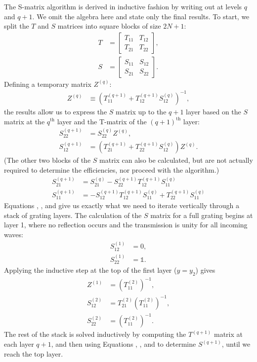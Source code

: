 The S-matrix algorithm is derived in inductive fashion by writing out  at levels $q$ and $q+1$.  We omit the algebra here and state only the final results.  To start, we split the $T$ and $S$ matrices into square blocks of size $2N+1$:
\begin{align}
T &= \left[\begin{array}{c|c}T_{11} & T_{12} \\\hline T_{21} & T_{22}\end{array}\right], \\
S &= \left[\begin{array}{c|c}S_{11} & S_{12} \\\hline S_{21} & S_{22}\end{array}\right].
\end{align}
Defining a temporary matrix $Z^{(q)}$:
\begin{align}
\label{SmatZ}
Z^{(q)} &\equiv \left(T^{(q+1)}_{11} + T^{(q+1)}_{12}S^{(q)}_{12} \right)^{-1},
\end{align}
the results allow us to express the $S$ matrix up to the $q+1$ layer based on the $S$ matrix at the $q^\textrm{th}$ layer and the T-matrix of the $(q+1)^\textrm{th}$ layer:
\begin{align}
\label{Smat22}
S^{(q+1)}_{22} &= S^{(q)}_{22} Z^{(q)} ,\\
\label{Smat12}
S^{(q+1)}_{12} &= \left(T^{(q+1)}_{21} + T^{(q+1)}_{22}S^{(q)}_{12} \right) Z^{(q)}.
\end{align}
(The other two blocks of the $S$ matrix can also be calculated, but are not actually required to determine the efficiencies, nor proceed with the algorithm.)
\begin{align}
S^{(q+1)}_{21} &= S^{(q)}_{21} - S^{(q+1)}_{22} T^{(q+1)}_{12} S^{(q)}_{11} \\
S^{(q+1)}_{11} &= - S^{(q+1)}_{12} T^{(q+1)}_{12} S^{(q)}_{11} + T^{(q+1)}_{22}S^{(q)}_{11}
\end{align}
Equations , , and  give us exactly what we need to iterate vertically through a stack of grating layers.  The calculation of the $S$ matrix for a full grating begins at layer 1, where no reflection occurs and the transmission is unity for all incoming waves:
\begin{align}
S^{(1)}_{12} &= 0,\\
S^{(1)}_{22} &= \mathbb{1}.
\end{align}
Applying the inductive step at the top of the first layer ($y=y_2$) gives
\begin{align}
Z^{(1)} &= \left(T^{(2)}_{11}  \right)^{-1} ,\\
S^{(2)}_{12} &= T^{(2)}_{21}  \left(T^{(2)}_{11}  \right)^{-1} ,\\
S^{(2)}_{22} &= \left(T^{(2)}_{11}  \right)^{-1}.
\end{align}
The rest of the stack is solved inductively by computing the $T^{(q+1)}$ matrix at each layer $q+1$, and then using Equations , , and  to determine $S^{(q+1)}$, until we reach the top layer.

